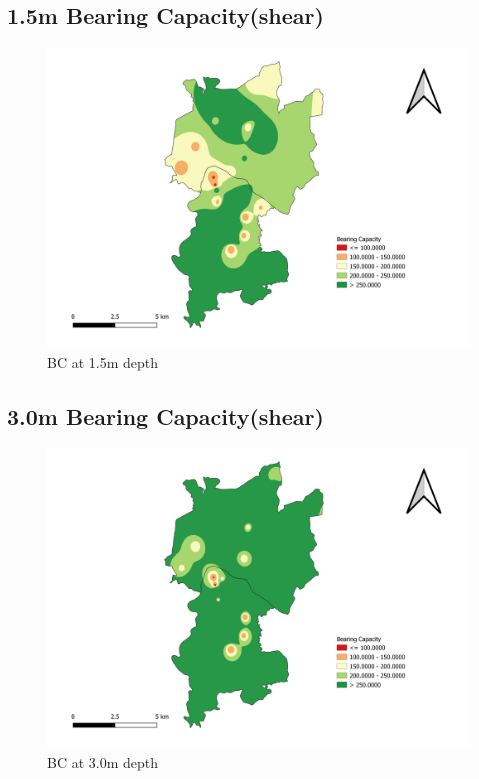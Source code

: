 \begin{landscape}
\section{1.5m Bearing Capacity(shear)}
\begin{figure}[!hbt]
\centering
\includegraphics[width=0.8\linewidth, height=0.8\textheight,keepaspectratio]{in/map/Shear_1_5.png}
\caption{BC at 1.5m depth}
\end{figure}
\pagebreak
\end{landscape}

\begin{landscape}
\section{3.0m Bearing Capacity(shear)}
\begin{figure}[!hbt]
\centering
\includegraphics[width=0.8\linewidth, height=0.8\textheight,keepaspectratio]{in/map/Shear_3_0.png}
\caption{BC at 3.0m depth}
\end{figure}
\pagebreak
\end{landscape}

